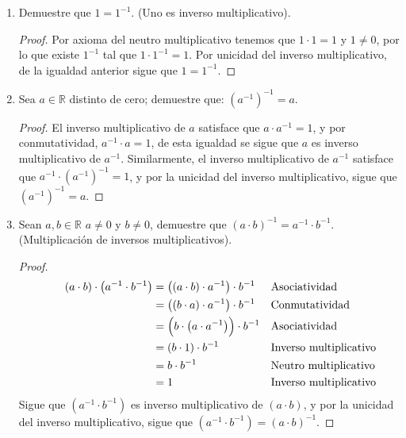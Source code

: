 \documentclass[11pt]{article}
\newcommand{\R}{\mathbb{R}}
\begin{document}
\begin{enumerate}[label=\alph*)]
    \item Demuestre que $1=1^{-1}$. (Uno es inverso multiplicativo).
    \vspace{-1em}\begin{proof} 
        Por axioma del neutro multiplicativo tenemos que $1\cdot 1 = 1$ y $1\neq 0$, por lo que existe $1^{-1}$ tal que $1 \cdot 1^{-1}=1$. Por unicidad del inverso multiplicativo, de la igualdad anterior sigue que $1=1^{-1}$.
    \end{proof} \vspace{-1em}

    \item Sea $a\in \R$ distinto de cero; demuestre que: $\left( a^{-1} \right)^{-1}=a$.
    
    \vspace{-1em}\begin{proof} 
        El inverso multiplicativo de $a$ satisface que $a\cdot a^{-1}=1$, y por conmutatividad, $a^{-1} \cdot a=1$, de esta igualdad se sigue que $a$ es inverso multiplicativo de $a^{-1}$. Similarmente, el inverso multiplicativo de $a^{-1}$ satisface que $ a^{-1} \cdot \left( a^{-1} \right)^{-1} =1$, y por la unicidad del inverso multiplicativo, sigue que $\left( a^{-1} \right)^{-1}=a$.  
    \end{proof} \vspace{-1em}
    
    \item Sean $a,b\in \R$ $a\neq 0$ y $b\neq 0$, demuestre que $(a \cdot b)^{-1}=a^{-1} \cdot b^{-1}$. (Multiplicación de inversos multiplicativos).
    \vspace{-2em}\begin{proof} 
        \begin{align*}
        && \quad \left(a \cdot b \right) \cdot  \left(a^{-1} \cdot b^{-1}  \right)	&=	 \left( \left(a \cdot b\right) \cdot a^{-1}  \right) \cdot b^{-1}  	&& \text{Asociatividad}\\
        && \quad &=	 \left( \left(b\cdot a \right) \cdot a^{-1}  \right) \cdot b^{-1}  	&& \text{Conmutatividad}\\
        && \quad &=	 \Bigl(b\cdot  \left(a \cdot a^{-1}\right) \Bigr) \cdot b^{-1}	&& \text{Asociatividad}\\
        && \quad &=	 \left(b\cdot 1 \right) \cdot b^{-1}	&& \text{Inverso multiplicativo}\\
        && \quad &=	b\cdot b^{-1}	&& \text{Neutro multiplicativo}\\
        && \quad &=	1	&& \text{Inverso multiplicativo}
        \end{align*}
        Sigue que $\left(a^{-1} \cdot b^{-1} \right)$ es inverso multiplicativo de $\left( a \cdot b\right)$, y por la unicidad del inverso multiplicativo, sigue que $\left(a^{-1} \cdot b^{-1} \right) = \left( a \cdot b\right)^{-1}$.    
    \end{proof} \vspace{-1em}
    

\end{enumerate}
\end{document}
